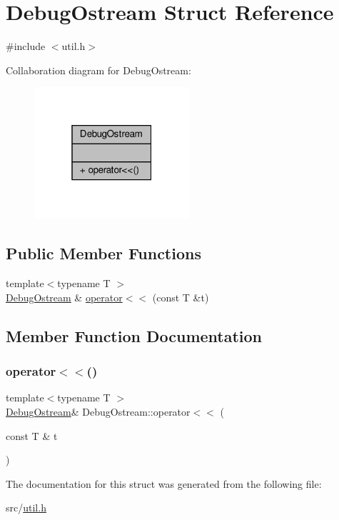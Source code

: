 \hypertarget{structDebugOstream}{}\section{Debug\+Ostream Struct Reference}
\label{structDebugOstream}


{\ttfamily \#include $<$util.\+h$>$}



Collaboration diagram for Debug\+Ostream\+:\nopagebreak
\begin{figure}[H]
\begin{center}
\leavevmode
\includegraphics[width=163pt]{structDebugOstream__coll__graph}
\end{center}
\end{figure}
\subsection*{Public Member Functions}
\begin{DoxyCompactItemize}
\item 
{\footnotesize template$<$typename T $>$ }\\\hyperlink{structDebugOstream}{Debug\+Ostream} \& \hyperlink{structDebugOstream_aacc5443d8507e8c56793047f020b375d}{operator$<$$<$} (const T \&t)
\end{DoxyCompactItemize}


\subsection{Member Function Documentation}
\mbox{\label{structDebugOstream_aacc5443d8507e8c56793047f020b375d}} 
\subsubsection{\texorpdfstring{operator$<$$<$()}{operator<<()}}
{\footnotesize\ttfamily template$<$typename T $>$ \\
\hyperlink{structDebugOstream}{Debug\+Ostream}\& Debug\+Ostream\+::operator$<$$<$ (\begin{DoxyParamCaption}\item[{const T \&}]{t }\end{DoxyParamCaption})\hspace{0.3cm}{\ttfamily [inline]}}



The documentation for this struct was generated from the following file\+:\begin{DoxyCompactItemize}
\item 
src/\hyperlink{util_8h}{util.\+h}\end{DoxyCompactItemize}
